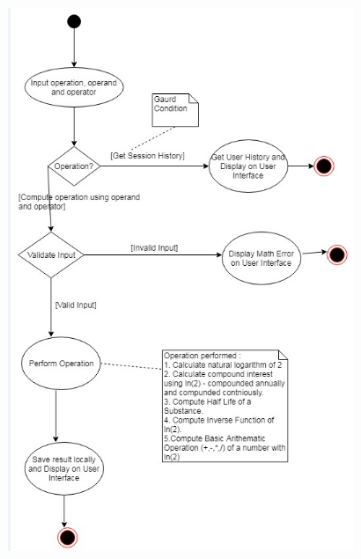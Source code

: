 \documentclass[12pt]{article}
\begin{document}
\begin{figure}[H]
	\begin{Center}
		\includegraphics[width=3.6in,height=5.66in]{./media/image6.png}
	\end{Center}
\end{figure}



\section*{ }

\vspace{\baselineskip}

\vspace{\baselineskip}

\vspace{\baselineskip}

\vspace{\baselineskip}

\vspace{\baselineskip}

\vspace{\baselineskip}
\end{document}
